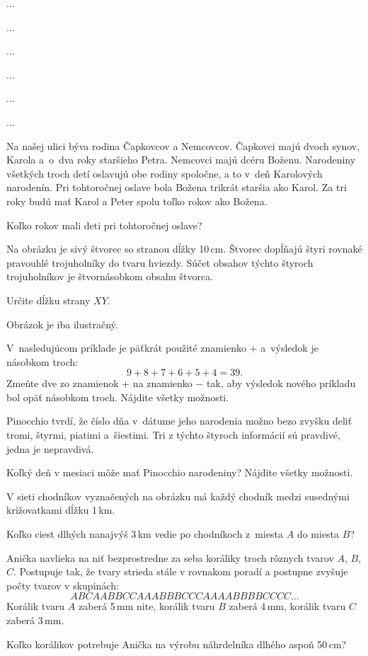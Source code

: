 {%
...}

{%
...}

{%
...}

{%
...}

{%
...}

{%
...}

{%
Na našej ulici býva rodina Čapkovcov a Nemcovcov.
Čapkovci majú dvoch synov, Karola a~o~dva roky staršieho Petra.
Nemcovci majú dcéru Boženu.
Narodeniny všetkých troch detí oslavujú obe rodiny spoločne, a to v~deň Karolových narodenín.
Pri tohtoročnej oslave bola Božena trikrát staršia ako Karol.
Za tri roky budú mať Karol a Peter spolu toľko rokov ako Božena.

Koľko rokov mali deti pri tohtoročnej oslave?
}

{%
Na obrázku je sivý štvorec so stranou dĺžky 10\,cm.
Štvorec dopĺňajú štyri rovnaké pravouhlé trojuholníky do tvaru hviezdy.
Súčet obsahov týchto štyroch trojuholníkov je štvornásobkom obsahu štvorca.

Určite dĺžku strany $XY$.
%

\poznamka
Obrázok je iba ilustračný.
}

{%
V~nasledujúcom príklade je päťkrát použité znamienko $+$ a~výsledok je násobkom troch:
$$
9+8+7+6+5+4 =39.
$$
Zmeňte dve zo znamienok $+$ na znamienko $-$ tak, aby výsledok nového príkladu bol opäť násobkom troch.
Nájdite všetky možnosti.
}

{%
Pinocchio tvrdí, že číslo dňa v~dátume jeho narodenia možno bezo zvyšku deliť tromi, štyrmi, piatimi a~šiestimi.
Tri z týchto štyroch informácií sú pravdivé, jedna je nepravdivá.

Koľký deň v mesiaci môže mať Pinocchio narodeniny?
Nájdite všetky možnosti.
}

{%
V sieti chodníkov vyznačených na obrázku má každý chodník medzi susednými križovatkami dĺžku 1\,km.

Koľko ciest dlhých nanajvýš 3\,km vedie po chodníkoch z~miesta $A$ do miesta $B$?
%
}

{%
Anička navlieka na niť bezprostredne za seba koráliky troch rôznych tvarov $A$, $B$, $C$.
Postupuje tak, že tvary strieda stále v rovnakom poradí a postupne zvyšuje počty tvarov v skupinách:
$$
ABCAABBCCAAABBBCCCAAAABBBBCCCC\dots
$$
Korálik tvaru $A$ zaberá 5\,mm nite, korálik tvaru $B$ zaberá 4\,mm, korálik tvaru $C$ zaberá 3\,mm.

Koľko korálikov potrebuje Anička na výrobu náhrdelníka dlhého aspoň 50\,cm?
}

